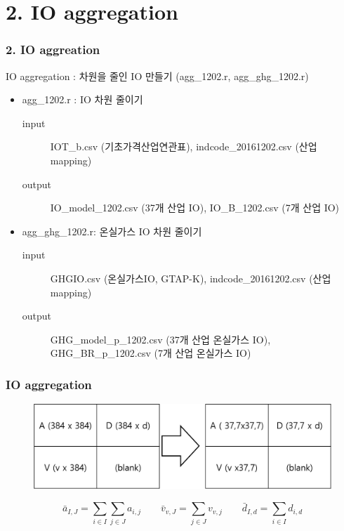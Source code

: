 \documentclass{beamer}
\begin{document}
\section{ 2. IO aggregation}
\begin{frame}
	\frametitle{2. IO aggreation}
	IO aggregation : 차원을 줄인 IO 만들기 (agg\_1202.r, agg\_ghg\_1202.r)
		\begin{itemize}
		\item {agg\_1202.r : IO 차원 줄이기}
			\begin{description}
				\item[input]{IOT\_b.csv (기초가격산업연관표), indcode\_20161202.csv (산업 mapping)}
				\item[output]{IO\_model\_1202.csv (37개 산업 IO), IO\_B\_1202.csv (7개 산업 IO)}
			\end{description}
		\item{agg\_ghg\_1202.r: 온실가스 IO 차원 줄이기}
			\begin{description}
			\item[input]{GHGIO.csv (온실가스IO, GTAP-K), indcode\_20161202.csv (산업 mapping)}
				\item[output]{GHG\_model\_p\_1202.csv (37개 산업 온실가스 IO), GHG\_BR\_p\_1202.csv (7개 산업 온실가스 IO)}			\end{description}
		\end{itemize}
		\end{frame}

\begin{frame}
	\frametitle{IO aggregation}

	\begin{figure}
		\centering
		\includegraphics[width=1.00\textwidth]{IOagg.png}
	\end{figure}
		\begin{displaymath}
	\bar{a}_{I,J}=\sum_{i\in I}\sum_{j\in J} a_{i,j}\qquad\bar{v}_{v,J}=\sum_{j \in J}v_{v,j}\qquad\bar{d}_{I,d}=\sum_{i\in I}d_{i,d}
	\end{displaymath}
\end{frame}
\end{document}
